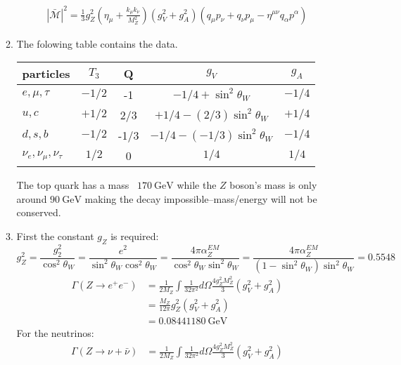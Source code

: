 \documentclass[12pt,a4]{article}
\begin{document}
\begin{enumerate}
\begin{enumerate}
\begin{align*}
          |\bar{\mathcal{M}}|^2 = \frac{1}{3} g_Z^2 \left(\eta_{\mu} + \frac{k_\mu k_\nu }{M_Z^2}\right) (g_V^2 + g_A^2)\left( q_\mu p_\nu +  q_\nu p_\mu - \eta^{\mu\nu}  q_\alpha p^\alpha\right)
        \end{align*}
      \item
        The folowing table contains the data.
        \begin{table}[!h]
          \centering
          \begin{tabular}{l c c c c}
            \toprule
            particles         & $T_3$ & Q & $g_V$ & $g_A$ \\
            \midrule
            $e, \mu, \tau$    & $-1/2$   & -1 & $-1/4 + \sin^2\theta_W$ & $-1/4$ \\
            $u, c        $    & $+1/2$  & 2/3 & $+1/4 - (2 / 3) \sin^2\theta_W$ & $+1/4$ \\
            $d, s , b    $    & $-1/2$  & -1/3 & $-1/4 - (-1/3) \sin^2 \theta_W$ & $-1/4$ \\
            $\nu_e, \nu_\mu, \nu_\tau $ & $1/2$ & 0 & $1 / 4$ & $1 / 4$ \\
            \bottomrule
          \end{tabular}
        \end{table}
        The top quark has a mass ~$\SI{170}{\giga \eV}$ while the $Z$ boson's mass is only around $\SI{90}{\giga \eV}$ making the decay impossible--mass/energy will not be conserved.
      \item
        First the constant $g_Z$ is required:
        \begin{equation*}
          g_Z^2 = \frac{g_2^2}{\cos^2 \theta_W} = \frac{e^2}{\sin^2 \theta_W \cos^2 \theta_W} = \frac{4 \pi \alpha_Z^{EM}}{\cos^2 \theta_W \sin^2 \theta_W} = \frac{4 \pi \alpha_Z^{EM}}{(1 - \sin^2 \theta_W) \sin^2 \theta_W} = 0.5548
        \end{equation*}
        \begin{align*}
          \Gamma(Z \to e^+ e^-) 
                                &= \frac{1}{2 M_Z}\int \frac{1}{32 \pi^2} d\Omega \frac{4 g_Z^2 M_Z^2}{3} (g_V^2 + g_A^2) \\
                                &= \frac{M_Z}{12 \pi } g_Z^2 (g_V^2 + g_A^2) \\
                                &= \SI{0.08441180}{\giga \eV}
        \end{align*}
        For the neutrinos:
        \begin{align*}
          \Gamma(Z \to \nu+ \bar{\nu}) 
                                &= \frac{1}{2 M_Z}\int \frac{1}{32 \pi^2} d\Omega \frac{4 g_Z^2 M_Z^2}{3} (g_V^2 + g_A^2) \\

\end{align*}
\end{enumerate}
\end{enumerate}
\end{document}
